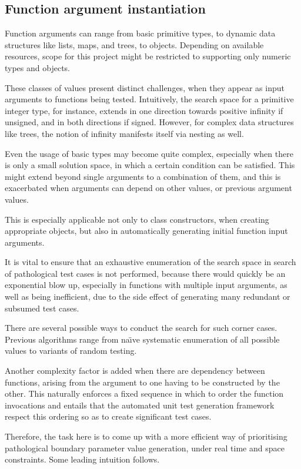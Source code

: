 \documentclass{icldt}
\numberwithin{equation}{section}       %
\def\naive{na\"{\i}ve }
\begin{document}
{\subsection{Function argument instantiation}
Function arguments can range from basic primitive types, to dynamic data structures like lists, maps, and trees, to objects. Depending on available resources, scope for this project might be restricted to supporting only numeric types and objects.

These classes of values present distinct challenges, when they appear as input arguments to functions being tested. Intuitively, the search space for a primitive integer type, for instance, extends in one direction towards positive infinity if unsigned, and in both directions if signed. However, for complex data structures like trees, the notion of infinity manifests itself via nesting as well.

Even the usage of basic types may become quite complex, especially when there is only a small solution space, in which a certain condition can be satisfied. This might extend beyond single arguments to a combination of them, and this is exacerbated when arguments can depend on other values, or previous argument values.

This is especially applicable not only to class constructors, when creating appropriate objects, but also in automatically generating initial function input arguments.

It is vital to ensure that an exhaustive enumeration of the search space in search of 
pathological test cases is not performed, because there would quickly be an exponential blow up, especially in functions with multiple input arguments, as well as being inefficient, due to the side effect of generating many redundant or subsumed test cases.

There are several possible ways to conduct the search for such corner cases. Previous algorithms range from \naive systematic enumeration of all possible values to variants of random testing.

Another complexity factor is added when there are dependency between functions, arising from the argument to one having to be constructed by the other. This naturally enforces a fixed sequence in which to order the function invocations and entails that the automated unit test generation framework respect this ordering so as to create significant test cases.

Therefore, the task here is to come up with a more efficient way of prioritising pathological boundary parameter value generation, under real time and space constraints. Some leading intuition follows.
}
\end{document}
